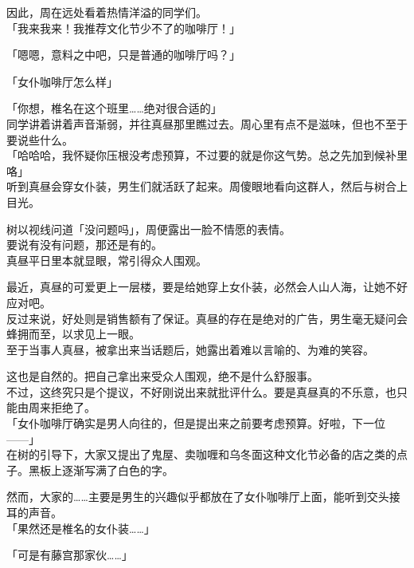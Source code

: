 因此，周在远处看着热情洋溢的同学们。\\

「我来我来！我推荐文化节少不了的咖啡厅！」

「嗯嗯，意料之中吧，只是普通的咖啡厅吗？」

「女仆咖啡厅怎么样」

「你想，椎名在这个班里……绝对很合适的」\\

同学讲着讲着声音渐弱，并往真昼那里瞧过去。周心里有点不是滋味，但也不至于要说些什么。\\

「哈哈哈，我怀疑你压根没考虑预算，不过要的就是你这气势。总之先加到候补里咯」\\

听到真昼会穿女仆装，男生们就活跃了起来。周傻眼地看向这群人，然后与树合上目光。

树以视线问道「没问题吗」，周便露出一脸不情愿的表情。\\

要说有没有问题，那还是有的。\\

真昼平日里本就显眼，常引得众人围观。

最近，真昼的可爱更上一层楼，要是给她穿上女仆装，必然会人山人海，让她不好应对吧。\\

反过来说，好处则是销售额有了保证。真昼的存在是绝对的广告，男生毫无疑问会蜂拥而至，以求见上一眼。\\

至于当事人真昼，被拿出来当话题后，她露出着难以言喻的、为难的笑容。

这也是自然的。把自己拿出来受众人围观，绝不是什么舒服事。\\

不过，这终究只是个提议，不好刚说出来就批评什么。要是真昼真的不乐意，也只能由周来拒绝了。\\

「女仆咖啡厅确实是男人向往的，但是提出来之前要考虑预算。好啦，下一位——」\\

在树的引导下，大家又提出了鬼屋、卖咖喱和乌冬面这种文化节必备的店之类的点子。黑板上逐渐写满了白色的字。

然而，大家的……主要是男生的兴趣似乎都放在了女仆咖啡厅上面，能听到交头接耳的声音。\\

「果然还是椎名的女仆装……」

「可是有藤宫那家伙……」

